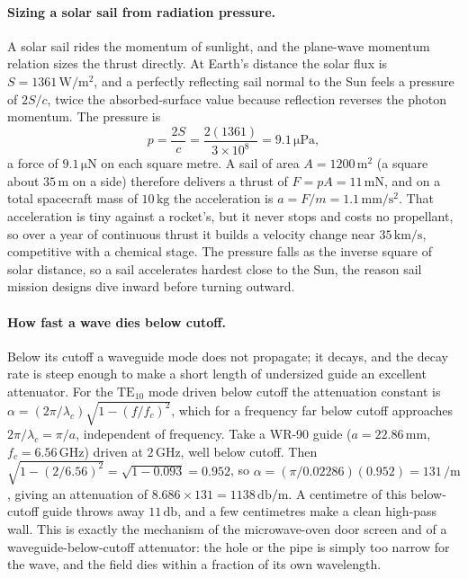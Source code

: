 \paragraph{Sizing a solar sail from radiation pressure.}
A solar sail rides the momentum of sunlight, and the plane-wave momentum
relation sizes the thrust directly. At Earth's distance the solar flux is
$S = 1361\,\si{\watt\per\meter\squared}$, and a perfectly reflecting sail
normal to the Sun feels a pressure of $2S/c$, twice the absorbed-surface
value because reflection reverses the photon momentum. The pressure is
\[
p = \frac{2S}{c} = \frac{2(1361)}{3\times 10^{8}} = 9.1\,\si{\micro
\pascal},
\]
a force of $9.1\,\si{\micro\newton}$ on each square metre. A sail of area
$A = 1200\,\si{\meter}^{2}$ (a square about $35\,\si{\meter}$ on a side)
therefore delivers a thrust of $F = pA = 11\,\si{\milli\newton}$, and on a
total spacecraft mass of $10\,\si{\kilogram}$ the acceleration is $a = F/m
= 1.1\,\si{\milli\meter\per\second\squared}$. That acceleration is tiny
against a rocket's, but it never stops and costs no propellant, so over a
year of continuous thrust it builds a velocity change near $35\,\si{\kilo
\meter\per\second}$, competitive with a chemical stage. The pressure falls
as the inverse square of solar distance, so a sail accelerates hardest
close to the Sun, the reason sail mission designs dive inward before
turning outward.

\paragraph{How fast a wave dies below cutoff.}
Below its cutoff a waveguide mode does not propagate; it decays, and the
decay rate is steep enough to make a short length of undersized guide an
excellent attenuator. For the $\text{TE}_{10}$ mode driven below cutoff
the attenuation constant is $\alpha = (2\pi/\lambda_c)\sqrt{1-(f/f_c)^2}$,
which for a frequency far below cutoff approaches $2\pi/\lambda_c = \pi/a$,
independent of frequency. Take a WR-90 guide ($a = 22.86\,\si{\milli
\meter}$, $f_c = 6.56\,\si{\giga\hertz}$) driven at $2\,\si{\giga\hertz}$,
well below cutoff. Then $\sqrt{1-(2/6.56)^2} = \sqrt{1-0.093} = 0.952$, so
$\alpha = (\pi/0.02286)(0.952) = 131\,\si{\per\meter}$, giving an
attenuation of $8.686\times 131 = 1138\,\si{\decibel\per\meter}$. A
centimetre of this below-cutoff guide throws away $11\,\si{\decibel}$, and
a few centimetres make a clean high-pass wall. This is exactly the
mechanism of the microwave-oven door screen and of a waveguide-below-cutoff
attenuator: the hole or the pipe is simply too narrow for the wave, and the
field dies within a fraction of its own wavelength.

